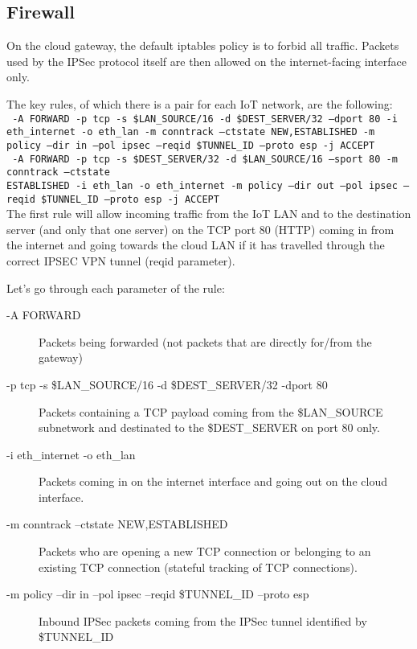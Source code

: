 \documentclass[paper=a4, fontsize=11pt]{scrartcl}
\begin{document}
\subsection{Firewall}\label{firewall}

On the cloud gateway, the default iptables policy is to forbid all traffic.
Packets used by the IPSec protocol itself are then allowed on the
internet-facing interface only.

The key rules, of which there is a pair for each IoT network, are the following:
\\

\texttt{%
    -A FORWARD -p tcp -s \$LAN\_SOURCE/16 -d \$DEST\_SERVER/32 --dport 80 -i
    eth\_internet -o eth\_lan -m conntrack --ctstate NEW,ESTABLISHED -m policy
    --dir in --pol ipsec --reqid \$TUNNEL\_ID --proto esp -j ACCEPT
}
\\

\texttt{%
    -A FORWARD -p tcp -s \$DEST\_SERVER/32 -d \$LAN\_SOURCE/16 --sport 80 -m
    conntrack --ctstate \\ESTABLISHED -i eth\_lan -o eth\_internet -m policy --dir
    out --pol ipsec --reqid \$TUNNEL\_ID --proto esp -j ACCEPT
}
\\

The first rule will allow incoming traffic from the IoT LAN and to the
destination server (and only that one server) on the TCP port 80 (HTTP) coming
in from the internet and going towards the cloud LAN if it has travelled
through the correct IPSEC VPN tunnel (reqid parameter).

Let's go through each parameter of the rule:
\begin{description}
    \item [-A FORWARD] Packets being forwarded (not packets that are directly
        for/from the gateway)
    \item [-p tcp -s \$LAN\_SOURCE/16 -d \$DEST\_SERVER/32 -dport 80] Packets 
        containing a TCP payload coming from the \$LAN\_SOURCE subnetwork and
        destinated to the \$DEST\_SERVER on port 80 only.
    \item [-i eth\_internet -o eth\_lan] Packets coming in on the internet
        interface and going out on the cloud interface.
    \item [-m conntrack --ctstate NEW,ESTABLISHED] Packets who are opening a new
        TCP connection or belonging to an existing TCP connection (stateful
        tracking of TCP connections).
    \item [-m policy --dir in --pol ipsec --reqid \$TUNNEL\_ID --proto esp]
        Inbound IPSec packets coming from the IPSec tunnel identified by
        \$TUNNEL\_ID
\end{description}
\end{document}
